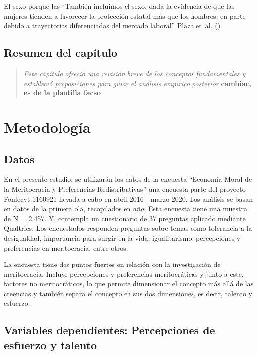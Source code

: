 \documentclass[
  spanish,
  a4paper,
  oneside]{scrbook}
\begin{document}
El sexo porque las ``También incluimos el sexo, dada la evidencia de que
las mujeres tienden a favorecer la protección estatal más que los
hombres, en parte debido a trayectorias diferenciadas del mercado
laboral'' Plaza et~al. ()

\section{Resumen del capítulo}\label{resumen-del-capuxedtulo}

\begin{quote}
\emph{Este capítulo ofreció una revisión breve de los conceptos
fundamentales y estableció proposiciones para guiar el análisis empírico
posterior} \textbf{cambiar, es de la plantilla facso}
\end{quote}


\chapter{Metodología}\label{metodologuxeda}

\section{Datos}\label{datos}

En el presente estudio, se utilizarán los datos de la encuesta
``Economía Moral de la Meritocracia y Preferencias Redistributivas'' una
encuesta parte del proyecto Fonfecyt 1160921 llevada a cabo en abril
2016 - marzo 2020. Los análisis se basan en datos de la primera ola,
recopilados en \emph{año}. Esta encuesta tiene una muestra de N = 2.457.
Y, contempla un cuestionario de 37 preguntas aplicado mediante
Qualtrics. Los encuestados responden preguntas sobre temas como
tolerancia a la desigualdad, importancia para surgir en la vida,
igualitarismo, percepciones y preferencias en meritocracia, entre otros.

La encuesta tiene dos puntos fuertes en relación con la investigación de
meritocracia. Incluye percepciones y preferencias meritocráticas y junto
a este, factores no meritocráticos, lo que permite dimensionar el
concepto más allá de las creencias y también separa el concepto en sus
dos dimensiones, es decir, talento y esfuerzo.

\section{Variables dependientes: Percepciones de esfuerzo y
talento}\label{variables-dependientes-percepciones-de-esfuerzo-y-talento}
\end{document}
